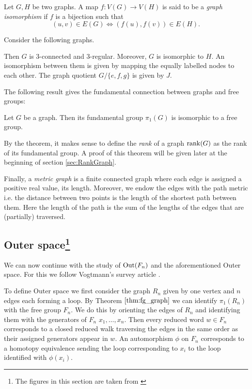 \begin{definition}
	Let $G,H$ be two graphs. A map $f: V(G) \to V(H)$ is said to be a \emph{graph isomorphism} if $f$ is a bijection such that
	\[
		(u,v) \in E(G) \Leftrightarrow (f(u),f(v)) \in E(H)
	.\] 
\end{definition}

\begin{eg}\label{ex:gAuto}
	Consider the following graphs.

	Then $G$ is $3$-connected and $3$-regular. Moreover, $G$ is isomorphic to $H$.
	An isomorphism between them is given by mapping the equally labelled nodes to each other.
	The graph quotient $G / \{e,f,g\}$ is given by $J$.
\end{eg}

The following result gives the fundamental connection between graphs and free groups:
\begin{theorem}\label{thm:fg_graph}
	Let $G$ be a graph. Then its fundamental group $\pi_{1}(G)$ is isomorphic to a free group.
\end{theorem}
By the theorem, it makes sense to define the \emph{rank} of a graph $\rank(G)$ as the rank of its fundamental group.
A proof of this theorem will be given later at the beginning of section \ref{sec:RankGraph}.

Finally, a \emph{metric graph} is a finite connected graph where each edge is assigned a positive real value, its length. 
Moreover, we endow the edges with the path metric i.e.
the distance between two points is the length of the shortest path between them.
Here the length of the path is the sum of the lengths of the edges that are (partially) traversed.

\subsection{Outer space\texorpdfstring{\footnote{The figures in this section are taken from \cite{vogtmann02}}}{}}
We can now continue with the study of $\operatorname{Out}(F_{n})$ and the aforementioned Outer space. 
For this we follow Vogtmann's survey article \cite{vogtmann02}.

To define Outer space we first consider the graph $R_{n}$ given by one vertex and $n$ edges each forming a loop.
By Theorem $\ref{thm:fg_graph}$ we can identify $\pi_1(R_{n})$ with the free group $F_{n}$.
We do this by orienting the edges of $R_{n}$ and identifying them with the generators of $F_{n}$ $x_1,\ldots,x_{n}$.
Then every reduced word $w \in F_{n}$ corresponds to a closed reduced walk traversing the edges in the same order as their assigned generators appear in $w$.
An automorphism $\phi$ on $F_{n}$ corresponds to a homotopy equivalence sending the loop corresponding to $x_{i}$
to the loop identified with $\phi(x_{i})$.

